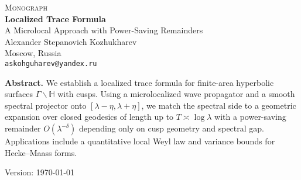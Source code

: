 \documentclass[11pt]{book}
\numberwithin{equation}{section}
\begin{document}
\begin{titlepage}
  \centering
  \vspace*{6mm}
  {\Large\scshape Monograph}\\[12mm]
  {\LARGE\bfseries Localized Trace Formula}\\[4mm]
  {\large A Microlocal Approach with Power-Saving Remainders}\\[16mm]

  {\large Alexander Stepanovich Kozhukharev}\\[2mm]
  Moscow, Russia\\[2mm]
  \texttt{askohguharev@yandex.ru}\\[14mm]

  \vfill

  \begin{tcolorbox}[colback=white,colframe=black!15,sharp corners,boxrule=0.3pt]
    \small
    \textbf{Abstract.}\;
    We establish a localized trace formula for finite-area hyperbolic surfaces
    $\Gamma\backslash\mathbb{H}$ with cusps. Using a microlocalized wave propagator
    and a smooth spectral projector onto $[\lambda-\eta,\lambda+\eta]$, we match the
    spectral side to a geometric expansion over closed geodesics of length up to
    $T\asymp\log\lambda$ with a power-saving remainder $O(\lambda^{-\delta})$
    depending only on cusp geometry and spectral gap. Applications include a
    quantitative local Weyl law and variance bounds for Hecke--Maass forms.
  \end{tcolorbox}

  \vfill
  {\small Version: \today}
\end{titlepage}

\setcounter{page}{1}

\tableofcontents
\clearpage













\end{document}
